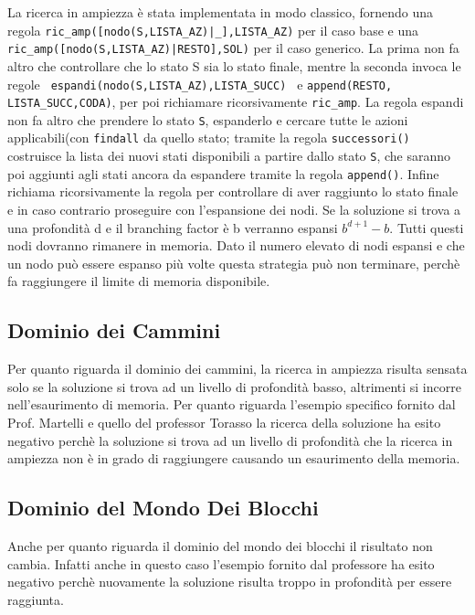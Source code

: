 La ricerca in ampiezza è stata implementata in modo classico, fornendo una regola \lstinline{ric_amp([nodo(S,LISTA_AZ)|_],LISTA_AZ)} per il caso base e una \lstinline{ric_amp([nodo(S,LISTA_AZ)|RESTO],SOL)} per il caso generico.
La prima non fa altro che controllare che lo stato S sia lo stato finale, mentre la seconda invoca le regole \lstinline{ espandi(nodo(S,LISTA_AZ),LISTA_SUCC) } e \lstinline{append(RESTO, LISTA_SUCC,CODA)}, per poi richiamare ricorsivamente \lstinline{ric_amp}.
La regola espandi non fa altro che prendere lo stato \lstinline{S}, espanderlo e cercare tutte le azioni applicabili(con \lstinline{findall} da quello stato; tramite la regola \lstinline{successori()} costruisce la lista dei nuovi stati disponibili a partire dallo stato \lstinline{S}, che saranno poi aggiunti agli stati ancora da espandere tramite la regola \lstinline{append()}.
Infine richiama ricorsivamente la regola per controllare di aver raggiunto lo stato finale e in caso contrario proseguire con l'espansione dei nodi. 
Se la soluzione si trova a una profondità d e il branching factor è b verranno espansi \begin{math} b^{d+1}-b \end{math}. Tutti questi nodi dovranno rimanere in memoria. Dato il numero elevato di nodi espansi e che un nodo può essere espanso più volte questa strategia può non terminare, perchè fa raggiungere il limite di memoria disponibile.

\subsection{Dominio dei Cammini}
Per quanto riguarda il dominio dei cammini, la ricerca in ampiezza risulta sensata solo se la soluzione si trova ad un livello di profondità basso, altrimenti si incorre nell'esaurimento di memoria. Per quanto riguarda l'esempio specifico fornito dal Prof. Martelli e quello del professor Torasso la ricerca della soluzione ha esito negativo perchè la soluzione si trova ad un livello di profondità che la ricerca in ampiezza non è in grado di raggiungere causando un esaurimento della memoria.

\subsection{Dominio del Mondo Dei Blocchi}
Anche per quanto riguarda il dominio del mondo dei blocchi il risultato non cambia. Infatti anche in questo caso l'esempio fornito dal professore ha esito negativo perchè nuovamente la soluzione risulta troppo in profondità per essere raggiunta.
\newpage
